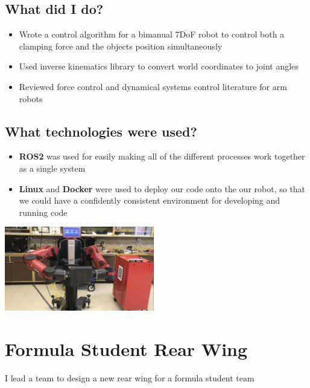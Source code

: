 \documentclass{article}
\begin{document}
\begin{multicols}{2}
    \subsection*{What did I do?}
    \begin{itemize}
        \item Wrote a control algorithm for a bimanual 7DoF robot to control both a clamping force and the objects position simultaneously
        \item Used inverse kinematics library to convert world coordinates to joint angles
        \item Reviewed force control and dynamical systems control literature for arm robots
    \end{itemize}
    \subsection*{What technologies were used?}
    \begin{itemize}
        \item \textbf{ROS2} was used for easily making all of the different processes work together as a single system
        \item \textbf{Linux} and \textbf{Docker} were used to deploy our code onto the our robot, so that we could have a confidently consistent environment for developing and running code
    \end{itemize}
    \vspace{10cm}
    \begin{center}
        \includegraphics[width=0.49\textwidth]{images/baxter.png}
    \end{center}
\end{multicols}
    
\section*{Formula Student Rear Wing}
I lead a team to design a new rear wing for a formula student team 
\end{document}

